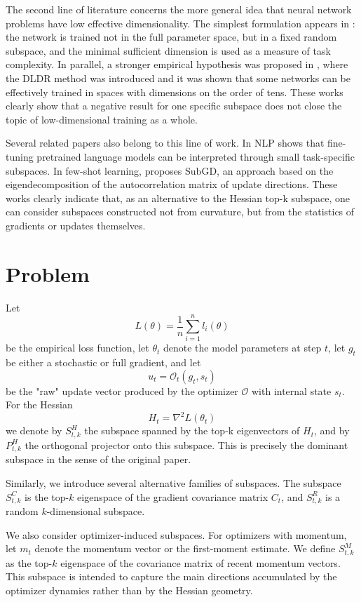 \documentclass[conference]{IEEEtran}
\begin{document}
The second line of literature concerns the more general idea that neural network problems have low effective dimensionality. The simplest formulation appears in \citet{LiMeasuring}: the network is trained not in the full parameter space, but in a fixed random subspace, and the minimal sufficient dimension is used as a measure of task complexity. In parallel, a stronger empirical hypothesis was proposed in \citet{LiDLDR}, where the DLDR method was introduced and it was shown that some networks can be effectively trained in spaces with dimensions on the order of tens. These works clearly show that a negative result for one specific subspace does not close the topic of low-dimensional training as a whole.

Several related papers also belong to this line of work. In NLP \citet{ZhangFineTuning} shows that fine-tuning pretrained language models can be interpreted through small task-specific subspaces. In few-shot learning, \citet{GauchFewShot} proposes SubGD, an approach based on the eigendecomposition of the autocorrelation matrix of update directions. These works clearly indicate that, as an alternative to the Hessian top-k subspace, one can consider subspaces constructed not from curvature, but from the statistics of gradients or updates themselves.

\section{Problem}

Let
\[
L(\theta) = \frac{1}{n}\sum_{i=1}^n l_i(\theta)
\]
be the empirical loss function, let $\theta_t$ denote the model parameters at step $t$, let $g_t$ be either a stochastic or full gradient, and let
\[
u_t = \mathcal{O}_t(g_t,s_t)
\]
be the "raw" update vector produced by the optimizer $\mathcal{O}$ with internal state $s_t$. For the Hessian
\[
H_t = \nabla^2 L(\theta_t)
\]
we denote by $S_{t,k}^H$ the subspace spanned by the top-k eigenvectors of $H_t$, and by $P_{t,k}^H$ the orthogonal projector onto this subspace. This is precisely the dominant subspace in the sense of the original paper.

Similarly, we introduce several alternative families of subspaces. 
The subspace $S_{t,k}^C$ is the top-$k$ eigenspace of the gradient covariance matrix $C_t$, and $S_{t,k}^R$ is a random $k$-dimensional subspace.

We also consider optimizer-induced subspaces. For optimizers with momentum, let $m_t$ denote the momentum vector or the first-moment estimate. We define $S_{t,k}^M$ as the top-$k$ eigenspace of the covariance matrix of recent momentum vectors. This subspace is intended to capture the main directions accumulated by the optimizer dynamics rather than by the Hessian geometry.
\end{document}
